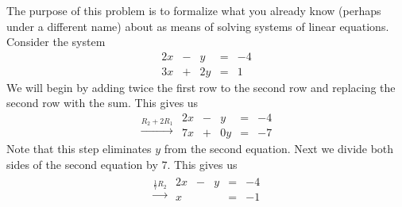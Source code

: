 \documentclass{ximera}
\begin{document}
\begin{initprob}\label{init:systwoeqs1} The purpose of this problem is to formalize what you already know (perhaps under a different name) about  as means of solving systems of linear equations.  Consider the system
\begin{equation}\label{eq:step1}
\begin{array}{ccccc}
      2x& -&y&=&-4\\
      3x & +&2y&= &1 
    \end{array}
\end{equation}
We will begin by adding twice the first row to the second row and replacing the second row with the sum.  This gives us
\begin{equation}\label{eq:step2}
\begin{array}{c}
\\
 \xrightarrow{R_2+2R_1}\\
 \end{array}
 \begin{array}{ccccc}
      2x& -&y&=&-4\\
      7x & +&0y&= &-7  
    \end{array}
\end{equation}
Note that this step eliminates $y$ from the second equation.  Next we divide both sides of the second equation by $7$.  This gives us
\begin{equation}\label{eq:step3}
\begin{array}{c}
\\
 \xrightarrow{\frac{1}{7}R_2}\\
 \end{array}
 \begin{array}{ccccc}
      
      2x& -&y&=&-4\\
      x & &&= &-1
	 

\end{array}
\end{equation}
\end{initprob}
\end{document}
